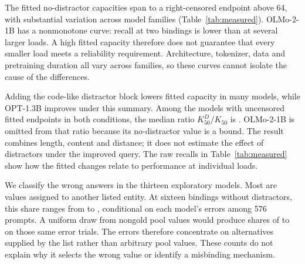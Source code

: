 \documentclass{article}
\begin{document}
The fitted no-distractor capacities span \NewKLo{} to a right-censored endpoint above 64, with substantial variation across model families (Table~\ref{tab:measured}).
OLMo-2-1B has a nonmonotone curve: recall at two bindings is lower than at several larger loads.
A high fitted capacity therefore does not guarantee that every smaller load meets a reliability requirement.
Architecture, tokenizer, data and pretraining duration all vary across families, so these curves cannot isolate the cause of the differences.

\label{sec:interference}
Adding the code-like distractor block lowers fitted capacity in many models, while OPT-1.3B improves under this summary.
Among the \NewRetainedN{} models with uncensored fitted endpoints in both conditions, the median ratio $K_{50}^{D}/K_{50}$ is \NewRetained{}.
OLMo-2-1B is omitted from that ratio because its no-distractor value is a bound.
The result combines length, content and distance; it does not estimate the effect of distractors under the improved query.
The raw recalls in Table~\ref{tab:measured} show how the fitted changes relate to performance at individual loads.

We classify the wrong answers in the thirteen exploratory models.
Most are values assigned to another listed entity.
At sixteen bindings without distractors, this share ranges from \NewListedErrorLo{} to \NewListedErrorHi{}, conditional on each model's errors among 576 prompts.
A uniform draw from nongold pool values would produce shares of \NewListedNullLo{} to \NewListedNullHi{} on those same error trials.
The errors therefore concentrate on alternatives supplied by the list rather than arbitrary pool values.
These counts do not explain why it selects the wrong value or identify a misbinding mechanism.
\end{document}
